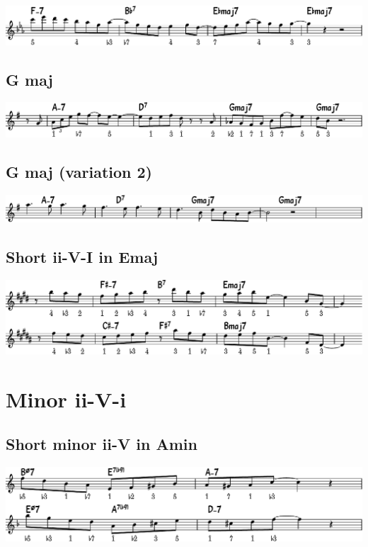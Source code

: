 \documentclass[11pt]{article}
\begin{document}
\begin{center}
\includegraphics[width=.98\linewidth]{e-flat.pdf}
\end{center}

\subsection{G maj}
\label{sec:org46eb585}
\begin{center}
\includegraphics[width=.98\linewidth]{g_maj.pdf}
\end{center}

\subsection{G maj (variation 2)}
\label{sec:org5bc3b5e}
\begin{center}
\includegraphics[width=.98\linewidth]{g_maj_v2.pdf}
\end{center}

\subsection{Short ii-V-I in Emaj}
\label{sec:org78175c3}
\begin{center}
\includegraphics[width=.98\linewidth]{short-ii-v-in-Emaj.pdf}
\end{center}

\section{Minor ii-V-i}
\label{sec:org6b62d26}
\subsection{Short minor ii-V in Amin}
\label{sec:org7c62be8}
\begin{center}
\includegraphics[width=.98\linewidth]{short-ii-v-in-Amin.pdf}
\end{center}
\end{document}
